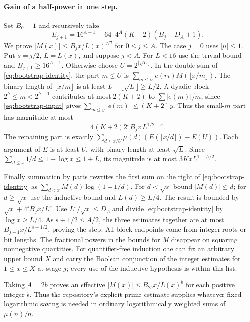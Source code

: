 \paragraph{Gain of a half-power in one step.}
Set $B_0=1$ and recursively take
\[
 B_{j+1}=16^{A+1}+64\cdot4^A(K+2)(B_j+D_A+1).
\]
We prove $|M(x)|\le B_j x/L(x)^{j/2}$ for $0\le j\le A$. The case
$j=0$ uses $|\mu|\le1$. Put $s=j/2$, $L=L(x)$, and suppose $j<A$.
For $L<16$ use the trivial bound and $B_{j+1}\ge16^{A+1}$. Otherwise
choose $U=2^{\lfloor\sqrt L\rfloor}$. In the double sum of
\eqref{eq:bootstrap-identity}, the part $m\le U$ is
$\sum_{m\le U}e(m)M(\lfloor x/m\rfloor)$. The binary length of
$\lfloor x/m\rfloor$ is at least $L-\lfloor\sqrt L\rfloor\ge L/2$.
A dyadic block $2^h\le m<2^{h+1}$ contributes at most $2(K+2)$
to $\sum |e(m)|/m$, since \eqref{eq:bootstrap-input} gives
$\sum_{m\le y}|e(m)|\le(K+2)y$. Thus the small-$m$ part has magnitude
at most
\[
       4(K+2) 2^s B_j x\, L^{1/2-s}.
\]
The remaining part is exactly
$\sum_{d\le x/U}\mu(d)(E(\lfloor x/d\rfloor)-E(U))$.
Each argument of $E$ is at least $U$, with binary length at least
$\sqrt L$. Since $\sum_{d\le x}1/d\le 1+\log x\le1+L$, its magnitude
is at most $3Kx L^{1-A/2}$.

Finally summation by parts rewrites the first sum on the right of
\eqref{eq:bootstrap-identity} as
$\sum_{d<x} M(d)\log(1+1/d)$. For $d<\sqrt x$ bound
$|M(d)|\le d$; for $d\ge\sqrt x$ use the inductive bound and
$L(d)\ge L/4$. The result is bounded by
$\sqrt x+4^s B_j x/L^s$.
Use $L^s/\sqrt x\le D_A$ and divide \eqref{eq:bootstrap-identity} by
$\log x\ge L/4$. As $s+1/2\le A/2$, the three estimates together
are at most $B_{j+1}x/L^{s+1/2}$, proving the step. All block endpoints
come from integer roots or bit lengths. The fractional powers in the
bounds for $M$ disappear on squaring nonnegative quantities. For
quantifier-free induction one can fix an arbitrary upper bound $X$ and
carry the Boolean conjunction of the integer estimates for $1\le x\le X$
at stage $j$; every use of the inductive hypothesis is within this list.

Taking $A=2b$ proves an effective $|M(x)|\le B_{2b}x/L(x)^b$ for
each positive integer $b$. Thus the repository's explicit prime estimate
supplies whatever fixed logarithmic saving is needed in ordinary
logarithmically weighted sums of $\mu(n)/n$.
